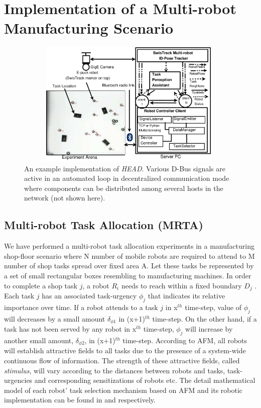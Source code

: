 \documentclass[draft]{ifacconf}
\begin{document}
\section{Implementation of a Multi-robot Manufacturing Scenario}
\label{sec:impl}
\begin{figure}
\begin{center}
\includegraphics[width=11cm,height=6cm]{./dia-files/RIL-Expt-Setup3}    %
\caption{An example implementation of {\em HEAD}. Various D-Bus signals are active in an automated loop in decentralized communication mode where components can be distributed among several hosts in the network (not shown here).} 
\label{fig:setup}
\end{center}
\end{figure}
\subsection{Multi-robot Task Allocation (MRTA)}
We have performed a multi-robot task allocation experiments in a manufacturing shop-floor scenario where N number of mobile robots are required to attend to M number of shop tasks spread over  fixed area A. Let these tasks be represented by a set of small rectangular boxes resembling to manufacturing machines. In order to complete a shop task $j$, a robot $R_i$ needs to reach within a fixed boundary $D_{j}$ . Each task $j$ has an associated task-urgency $\phi_j$ that indicates its relative importance over time. If a robot attends to a task $j$ in x$^{th}$ time-step, value of $\phi_j$ will decreases by a small amount $\delta_{\phi 1}$ in (x+1)$^{th}$ time-step. On the other hand, if a task has not been served by any robot in x$^{th}$ time-step, $\phi_j$ will increase by another small amount, $\delta_{\phi 2}$, in (x+1)$^{th}$ time-step. According to AFM, all robots will establish attractive fields to all tasks due to the presence of a system-wide continuous flow of information. The strength of these attractive fields, called {\em stimulus}, will vary according to the distances between robots and tasks, task-urgencies and corresponding sensitizations of robots etc. The detail mathematical model of each robot' task selection mechanism based on AFM and its robotic implementation can be found in \cite{Arcaute+2008} and \cite{Sarker+2010ants} respectively.
\end{document}
